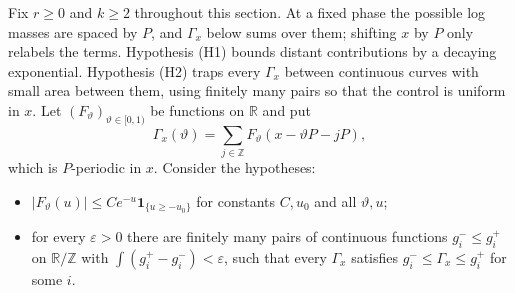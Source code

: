 \documentclass[11pt]{article}
\theoremstyle{definition}
\theoremstyle{remark}
\newcommand{\Z}{\mathbb Z}
\newcommand{\R}{\mathbb R}
\newcommand{\one}{\mathbf 1}
\begin{document}
Fix $r\ge0$ and $k\ge2$ throughout this section. At a fixed phase the
possible log masses are spaced by $P$, and $\Gamma_x$ below sums over
them; shifting $x$ by $P$ only relabels the terms. Hypothesis (H1)
bounds distant contributions by a decaying exponential. Hypothesis (H2)
traps every $\Gamma_x$ between continuous curves with small area
between them, using finitely many pairs so that the control is uniform
in $x$. Let $(F_\vartheta)_{\vartheta\in[0,1)}$ be functions on $\R$ and put
\[
 \Gamma_x(\vartheta)=\sum_{j\in\Z}F_\vartheta(x-\vartheta P-jP),
\]
which is $P$-periodic in $x$. Consider the hypotheses:
\begin{itemize}
\item[(H1)] $|F_\vartheta(u)|\le Ce^{-u}\one_{\{u\ge-u_0\}}$ for constants
 $C,u_0$ and all $\vartheta,u$;
\item[(H2)] for every $\varepsilon>0$ there are finitely many pairs of
 continuous functions $g_i^-\le g_i^+$ on $\R/\Z$ with
 $\int(g_i^+-g_i^-)<\varepsilon$, such that every $\Gamma_x$ satisfies
 $g_i^-\le\Gamma_x\le g_i^+$ for some $i$.
\end{itemize}
\end{document}
